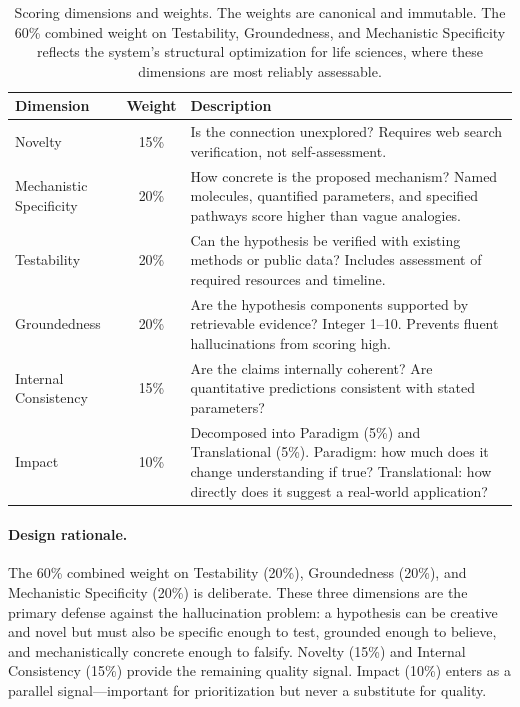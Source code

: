 \begin{table}[t]
\centering
\caption{Scoring dimensions and weights. The weights are canonical and immutable. The 60\% combined weight on Testability, Groundedness, and Mechanistic Specificity reflects the system's structural optimization for life sciences, where these dimensions are most reliably assessable.}
\label{tab:scoring}
\small
\begin{tabular}{@{}lcp{6.5cm}@{}}
\toprule
\textbf{Dimension} & \textbf{Weight} & \textbf{Description} \\
\midrule
Novelty & 15\% & Is the connection unexplored? Requires web search verification, not self-assessment. \\
Mechanistic Specificity & 20\% & How concrete is the proposed mechanism? Named molecules, quantified parameters, and specified pathways score higher than vague analogies. \\
Testability & 20\% & Can the hypothesis be verified with existing methods or public data? Includes assessment of required resources and timeline. \\
Groundedness & 20\% & Are the hypothesis components supported by retrievable evidence? Integer 1--10. Prevents fluent hallucinations from scoring high. \\
Internal Consistency & 15\% & Are the claims internally coherent? Are quantitative predictions consistent with stated parameters? \\
Impact & 10\% & Decomposed into Paradigm (5\%) and Translational (5\%). Paradigm: how much does it change understanding if true? Translational: how directly does it suggest a real-world application? \\
\bottomrule
\end{tabular}
\end{table}

\paragraph{Design rationale.} The 60\% combined weight on Testability (20\%), Groundedness (20\%), and Mechanistic Specificity (20\%) is deliberate. These three dimensions are the primary defense against the hallucination problem: a hypothesis can be creative and novel but must also be specific enough to test, grounded enough to believe, and mechanistically concrete enough to falsify. Novelty (15\%) and Internal Consistency (15\%) provide the remaining quality signal. Impact (10\%) enters as a parallel signal---important for prioritization but never a substitute for quality.

